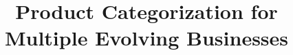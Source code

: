 \documentclass[sigconf, anonymous=true]{acmart}
\begin{document}
\title{Product Categorization for Multiple Evolving Businesses}

%







\end{document}
